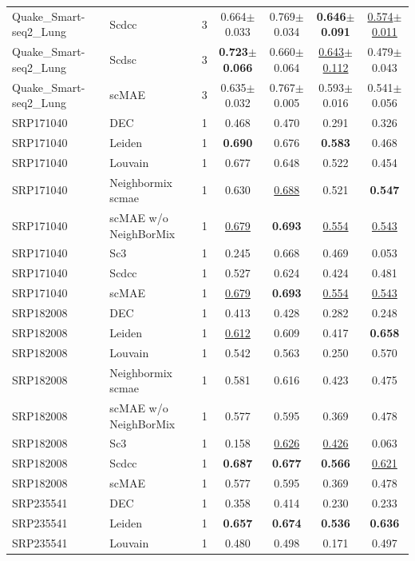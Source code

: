 \begin{table}[t]
\begin{tabular}{llrcccc}
Quake\_Smart-seq2\_Lung & Scdcc & 3 & 0.664$\pm$0.033 & 0.769$\pm$0.034 & \textbf{0.646$\pm$0.091} & \underline{0.574$\pm$0.011} \\
Quake\_Smart-seq2\_Lung & Scdsc & 3 & \textbf{0.723$\pm$0.066} & 0.660$\pm$0.064 & \underline{0.643$\pm$0.112} & 0.479$\pm$0.043 \\
Quake\_Smart-seq2\_Lung & scMAE & 3 & 0.635$\pm$0.032 & 0.767$\pm$0.005 & 0.593$\pm$0.016 & 0.541$\pm$0.056 \\
\midrule
SRP171040 & DEC & 1 & 0.468 & 0.470 & 0.291 & 0.326 \\
SRP171040 & Leiden & 1 & \textbf{0.690} & 0.676 & \textbf{0.583} & 0.468 \\
SRP171040 & Louvain & 1 & 0.677 & 0.648 & 0.522 & 0.454 \\
SRP171040 & Neighbormix scmae & 1 & 0.630 & \underline{0.688} & 0.521 & \textbf{0.547} \\
SRP171040 & scMAE w/o NeighBorMix & 1 & \underline{0.679} & \textbf{0.693} & \underline{0.554} & \underline{0.543} \\
SRP171040 & Sc3 & 1 & 0.245 & 0.668 & 0.469 & 0.053 \\
SRP171040 & Scdcc & 1 & 0.527 & 0.624 & 0.424 & 0.481 \\
SRP171040 & scMAE & 1 & \underline{0.679} & \textbf{0.693} & \underline{0.554} & \underline{0.543} \\
\midrule
SRP182008 & DEC & 1 & 0.413 & 0.428 & 0.282 & 0.248 \\
SRP182008 & Leiden & 1 & \underline{0.612} & 0.609 & 0.417 & \textbf{0.658} \\
SRP182008 & Louvain & 1 & 0.542 & 0.563 & 0.250 & 0.570 \\
SRP182008 & Neighbormix scmae & 1 & 0.581 & 0.616 & 0.423 & 0.475 \\
SRP182008 & scMAE w/o NeighBorMix & 1 & 0.577 & 0.595 & 0.369 & 0.478 \\
SRP182008 & Sc3 & 1 & 0.158 & \underline{0.626} & \underline{0.426} & 0.063 \\
SRP182008 & Scdcc & 1 & \textbf{0.687} & \textbf{0.677} & \textbf{0.566} & \underline{0.621} \\
SRP182008 & scMAE & 1 & 0.577 & 0.595 & 0.369 & 0.478 \\
\midrule
SRP235541 & DEC & 1 & 0.358 & 0.414 & 0.230 & 0.233 \\
SRP235541 & Leiden & 1 & \textbf{0.657} & \textbf{0.674} & \textbf{0.536} & \textbf{0.636} \\
SRP235541 & Louvain & 1 & 0.480 & 0.498 & 0.171 & 0.497 \\

\end{tabular}
\end{table}
